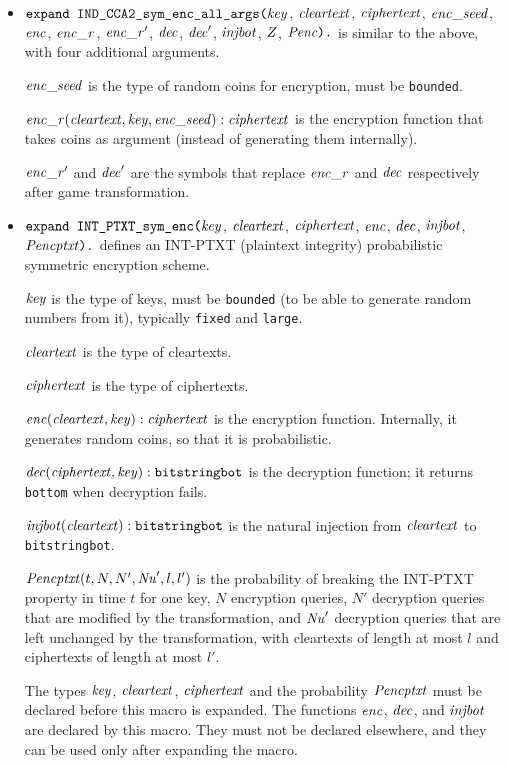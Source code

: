 \documentclass{article}
\begin{document}
\begin{itemize}
\item $\texttt{expand IND\_CCA2\_sym\_enc\_all\_args(}\mathit{key}$,
$  \mathit{cleartext}$, $\mathit{ciphertext}$, $\mathit{enc\_seed}$, $\mathit{enc}$, $\mathit{enc\_r}$, $\mathit{enc\_r}'$,
$  \mathit{dec}$, $\mathit{dec}'$, $\mathit{injbot}$, $\mathit{Z}$, $\mathit{Penc}\texttt{).}$ is similar to the above,
  with four additional arguments. 

  $\mathit{enc\_seed}$ is the type of random coins for encryption, must be \texttt{bounded}.

  $\mathit{enc\_r}(\mathit{cleartext}, \mathit{key}, \mathit{enc\_seed}): \mathit{ciphertext}$ is the encryption function that takes coins as argument (instead of generating them internally).

  $\mathit{enc\_r}'$ and $\mathit{dec}'$ are the symbols that replace $\mathit{enc\_r}$ and $\mathit{dec}$ respectively after game transformation.


\item $\texttt{expand INT\_PTXT\_sym\_enc(}\mathit{key}$,
$  \mathit{cleartext}$, $\mathit{ciphertext}$, $\mathit{enc}$,
$  \mathit{dec}$, $\mathit{injbot}$, $\mathit{Pencptxt}\texttt{).}$ defines an INT-PTXT (plaintext integrity)
  probabilistic symmetric encryption scheme.

   $\mathit{key}$ is the type of keys, must be \texttt{bounded} (to be able to generate random numbers from it), typically \texttt{fixed} and \texttt{large}.

   $\mathit{cleartext}$ is the type of cleartexts.

   $\mathit{ciphertext}$ is the type of ciphertexts.

   $\mathit{enc}(\mathit{cleartext}, \mathit{key}): \mathit{ciphertext}$ is the encryption function. Internally, it generates random coins, so that it is probabilistic.

   $\mathit{dec}(\mathit{ciphertext}, \mathit{key}): \texttt{bitstringbot}$ is the
  decryption function; it returns \texttt{bottom} when decryption
  fails.

   $\mathit{injbot}(\mathit{cleartext}): \texttt{bitstringbot}$ is the natural
  injection from $\mathit{cleartext}$ to \texttt{bitstringbot}.

  $\mathit{Pencptxt}(t, N, N', \mathit{Nu}', l, l')$ is the probability of breaking the
  INT-PTXT property in time $t$ for one key, $N$ encryption queries, $N'$
  decryption queries that are modified by the transformation, and 
  $\mathit{Nu}'$ decryption queries that are left unchanged by the transformation,
  with cleartexts of length at most $l$ and
  ciphertexts of length at most $l'$.

   The types $\mathit{key}$, $\mathit{cleartext}$,
   $\mathit{ciphertext}$ and the probability $\mathit{Pencptxt}$ must
   be declared before this macro is expanded. The functions
   $\mathit{enc}$, $\mathit{dec}$, and $\mathit{injbot}$ are declared by this
   macro. They must not be declared elsewhere, and they can be used
   only after expanding the macro.


\end{itemize}
\end{document}
